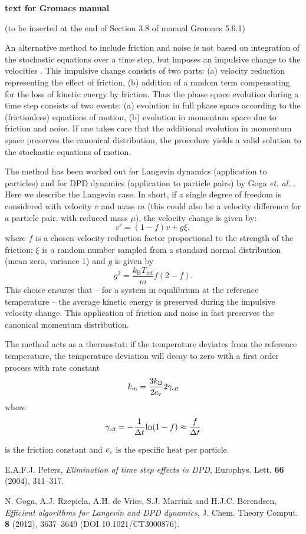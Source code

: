 \documentclass[a4paper,12pt]{article}
\newcommand{\be}{\begin{equation}}
\newcommand{\ee}{\end{equation}}
\begin{document}
\pagestyle{plain}
{\Large \textbf{text for Gromacs manual}}
\vspace{3cm}

(to be inserted at the end of Section 3.8 of manual Gromacs 5.6.1)

An alternative method to include friction and noise is not based on integration of the stochastic equations over a time step, but imposes an impulsive change to the velocities \cite{peters04}. This impulsive change consists of two parts: (a) velocity reduction representing the effect of friction, (b)  addition of a random term compensating for the loss of kinetic energy by friction. Thus the phase space evolution during a time step consists of two events: (a) evolution in full phase space according to the (frictionless) equations of motion, (b) evolution in momentum space   due to friction and noise. If one takes care that the additional evolution in momentum space preserves the canonical distribution, the procedure yields a valid solution to the stochastic equations of motion.

The method has been worked out for Langevin dynamics (application to particles) and for DPD dynamics (application to particle pairs) by Goga \textit{et. al.} \cite{goga12}. Here we describe the Langevin case. In short, if a single degree of freedom is considered with velocity $v$ and mass $m$ (this could also be a velocity difference for a particle pair, with reduced mass $\mu$), the velocity change is given by:\\
\be
   v' =  (1-f) v + g \xi,
\ee
where $f$ is a chosen velocity reduction factor proportional to the strength of the friction; $\xi$ is a random number sampled from a standard normal distribution (mean zero, variance 1) and $g$ is given by
\be
g^2 = \frac{k_\mathrm{B}T_\mathrm{ref}}{m} f(2-f).
\ee
This choice ensures that -- for a system in equilibrium at the reference temperature -- the average kinetic energy is preserved during the impulsive velocity change. This application of friction and noise in fact preserves the canonical momentum distribution.

The method acts as a thermostat: if the temperature deviates from the reference temperature, the temperature deviation will decay to zero with a first order process with rate constant  \cite{goga12}
\be
   k_{\mbox{\tiny th}}= \frac{3k_\mathrm{B}}{2c_\mathrm{v}} 2 \gamma_{\mbox{\tiny eff}}
\ee
where
\be
    \gamma_{\mbox{\tiny eff}} = - 
\frac{1}{\Delta t} \mbox{ln} (1-f) \approx \frac {f}{\Delta t}
\ee

is the friction constant and $c_{\mbox{\tiny v}}$ is the specific heat per particle.

\begin{thebibliography}{99}

E.A.F.J. Peters, \textit{Elimination of time step effects in DPD}, Europhys. Lett. \textbf{66} (2004), 311--317.

N. Goga, A.J. Rzepiela, A.H. de Vries, S.J. Marrink and H.J.C. Berendsen, \textit{Efficient algorithms for Langevin and DPD dynamics}, J. Chem. Theory Comput. \textbf{8} (2012), 3637--3649 (DOI 10.1021/CT3000876).

\end{thebibliography}
\end{document}
